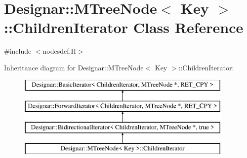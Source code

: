 \hypertarget{class_designar_1_1_m_tree_node_1_1_children_iterator}{}\section{Designar\+:\+:M\+Tree\+Node$<$ Key $>$\+:\+:Children\+Iterator Class Reference}
\label{class_designar_1_1_m_tree_node_1_1_children_iterator}


{\ttfamily \#include $<$nodesdef.\+H$>$}

Inheritance diagram for Designar\+:\+:M\+Tree\+Node$<$ Key $>$\+:\+:Children\+Iterator\+:\begin{figure}[H]
\begin{center}
\leavevmode
\includegraphics[height=4.000000cm]{class_designar_1_1_m_tree_node_1_1_children_iterator}
\end{center}
\end{figure}
